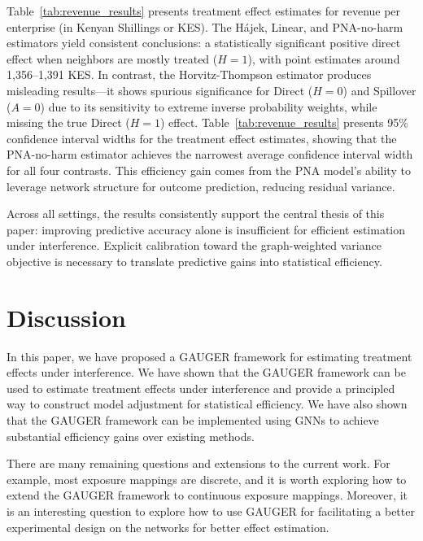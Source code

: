 \documentclass[twoside,letterpaper]{article}
\theoremstyle{plain}
\theoremstyle{definition}
\theoremstyle{remark}
\begin{document}
Table~\ref{tab:revenue_results} presents treatment effect estimates for revenue per enterprise (in Kenyan Shillings or KES). The H\'{a}jek, Linear, and PNA-no-harm estimators yield consistent conclusions: a statistically significant positive direct effect when neighbors are mostly treated ($H=1$), with point estimates around 1,356--1,391 KES. In contrast, the Horvitz-Thompson estimator produces misleading results---it shows spurious significance for Direct ($H=0$) and Spillover ($A=0$) due to its sensitivity to extreme inverse probability weights, while missing the true Direct ($H=1$) effect. Table~\ref{tab:revenue_results} presents 95\% confidence interval widths for the treatment effect estimates, showing that the PNA-no-harm estimator achieves the narrowest average confidence interval width for all four contrasts. This efficiency gain comes from the PNA model's ability to leverage network structure for outcome prediction, reducing residual variance.






Across all settings, the results consistently support the central thesis of this paper: improving predictive accuracy alone is insufficient for efficient estimation under interference. Explicit calibration toward the graph-weighted variance objective is necessary to translate predictive gains into statistical efficiency.

\section{Discussion}
In this paper, we have proposed a GAUGER framework for estimating treatment effects under interference. We have shown that the GAUGER framework can be used to estimate treatment effects under interference and provide a principled way to construct model adjustment for statistical efficiency. We have also shown that the GAUGER framework can be implemented using GNNs to achieve substantial efficiency gains over existing methods.

There are many remaining questions and extensions to the current work. For example, most exposure mappings are discrete, and it is worth exploring how to extend the GAUGER framework to continuous exposure mappings. Moreover, it is an interesting question to explore how to use GAUGER for facilitating a better experimental design on the networks for better effect estimation. 




\end{document}
